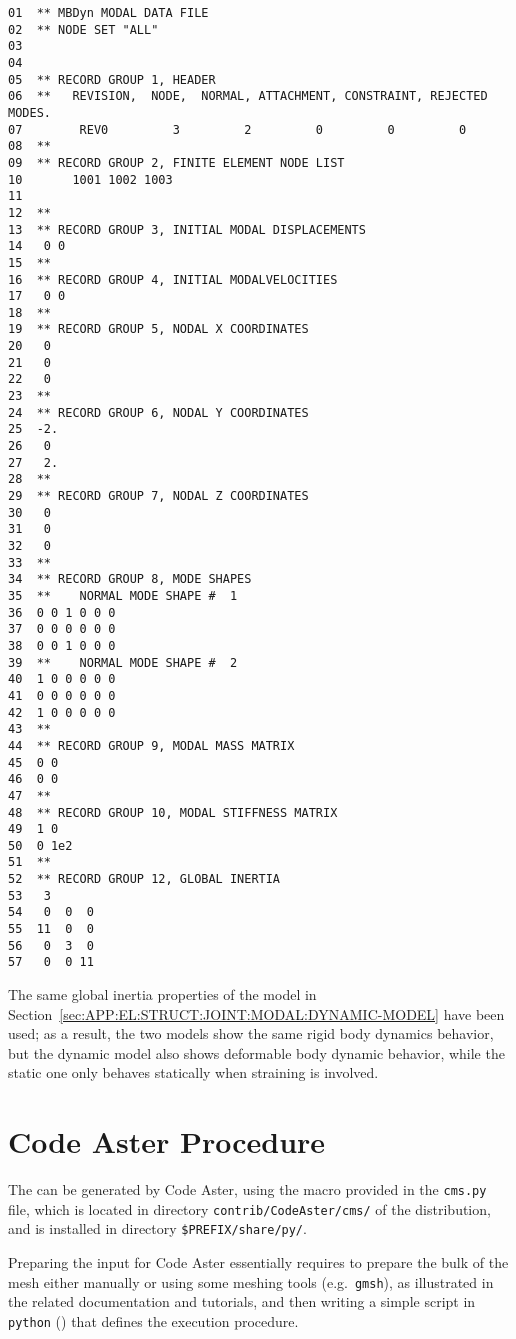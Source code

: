 \noindent
{\small
\begin{verbatim}
01  ** MBDyn MODAL DATA FILE
02  ** NODE SET "ALL" 
03    
04    
05  ** RECORD GROUP 1, HEADER
06  **   REVISION,  NODE,  NORMAL, ATTACHMENT, CONSTRAINT, REJECTED MODES.
07        REV0         3         2         0         0         0
08  **
09  ** RECORD GROUP 2, FINITE ELEMENT NODE LIST
10       1001 1002 1003
11  
12  **
13  ** RECORD GROUP 3, INITIAL MODAL DISPLACEMENTS
14   0 0
15  **
16  ** RECORD GROUP 4, INITIAL MODALVELOCITIES
17   0 0
18  **
19  ** RECORD GROUP 5, NODAL X COORDINATES
20   0
21   0
22   0
23  **
24  ** RECORD GROUP 6, NODAL Y COORDINATES
25  -2.
26   0
27   2.
28  **
29  ** RECORD GROUP 7, NODAL Z COORDINATES
30   0
31   0
32   0
33  **
34  ** RECORD GROUP 8, MODE SHAPES
35  **    NORMAL MODE SHAPE #  1
36  0 0 1 0 0 0
37  0 0 0 0 0 0
38  0 0 1 0 0 0
39  **    NORMAL MODE SHAPE #  2
40  1 0 0 0 0 0
41  0 0 0 0 0 0
42  1 0 0 0 0 0
43  **
44  ** RECORD GROUP 9, MODAL MASS MATRIX
45  0 0
46  0 0
47  **
48  ** RECORD GROUP 10, MODAL STIFFNESS MATRIX
49  1 0
50  0 1e2
51  **
52  ** RECORD GROUP 12, GLOBAL INERTIA
53   3
54   0  0  0
55  11  0  0
56   0  3  0
57   0  0 11
\end{verbatim}
}

The same global inertia properties of the model 
in Section~\ref{sec:APP:EL:STRUCT:JOINT:MODAL:DYNAMIC-MODEL} have been used;
as a result, the two models show the same rigid body dynamics behavior,
but the dynamic model also shows deformable body dynamic behavior, while
the static one only behaves statically when straining is involved.





\section{Code Aster Procedure}
\label{sec:APP:EL:STRUCT:JOINT:MODAL:ASTER}

The  can be generated by Code Aster, using
the macro provided in the \texttt{cms.py} file, 
which is located in directory \texttt{contrib/CodeAster/cms/} 
of the distribution, and is installed in directory
\texttt{\$PREFIX/share/py/}.

Preparing the input for Code Aster essentially requires to prepare
the bulk of the mesh either manually or using some meshing tools
(e.g.\ \texttt{gmsh}), as illustrated in the related documentation
and tutorials, and then writing a simple script in \texttt{python}
()
that defines the execution procedure.

